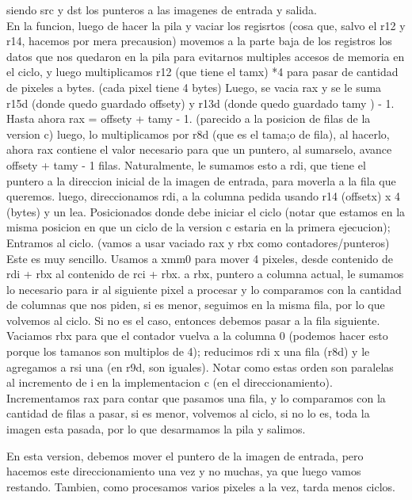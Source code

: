 \documentclass[a4paper]{article}
\begin{document}
     siendo src y dst los punteros a las imagenes de entrada y salida.
    \hfill \break
    \\
     En la funcion, luego de hacer la pila y vaciar los regisrtos (cosa que, salvo el r12 y r14, hacemos por mera precausion) movemos a la parte baja de los registros los datos que nos quedaron en la pila para evitarnos multiples accesos de memoria en el ciclo, y luego multiplicamos r12 (que tiene el tamx) *4 para pasar de cantidad de pixeles a bytes. (cada pixel tiene 4 bytes)
     \hfill \break
     Luego, se vacia rax y se le suma r15d (donde quedo guardado offsety) y r13d (donde quedo guardado tamy ) - 1.
     Hasta ahora rax = offsety + tamy - 1. (parecido a la posicion de filas de la version c) luego, lo multiplicamos por r8d (que es el tama;o de fila), al hacerlo, ahora rax contiene el valor necesario para que un puntero, al sumarselo, avance offsety + tamy - 1 filas. Naturalmente, le sumamos esto a rdi, que tiene el puntero a la direccion inicial de la imagen de entrada, para moverla a la fila que queremos. luego, direccionamos rdi, a la columna pedida usando r14 (offsetx) x 4 (bytes) y un lea. Posicionados donde debe iniciar el ciclo (notar que estamos en la misma posicion en que un ciclo de la version c estaria  en la primera ejecucion);
     \hfill \break
      Entramos al ciclo. (vamos a usar vaciado rax y rbx como contadores/punteros)
       Este es muy sencillo. Usamos a xmm0 para mover 4 pixeles, desde contenido de rdi + rbx al contenido de rci + rbx.
      a rbx,  puntero a columna actual, le sumamos lo necesario para ir al siguiente pixel a procesar y lo comparamos con la cantidad de columnas que nos piden, si es menor, seguimos en la misma fila, por lo que volvemos al ciclo.       
      Si no es el caso, entonces debemos pasar a la fila siguiente. Vaciamos rbx para que el contador vuelva a la columna 0 (podemos hacer esto porque los tamanos son multiplos de 4); reducimos rdi x una fila (r8d) y le agregamos a rsi una (en r9d, son iguales). Notar como estas orden son paralelas al incremento de i  en la implementacion c (en el direccionamiento).
      \hfill \break      
      Incrementamos rax para contar que pasamos una fila, y lo comparamos con la cantidad de filas a pasar, si es menor, volvemos al ciclo, si no lo es, toda la imagen esta pasada, por lo que desarmamos la pila y salimos.
      
      En esta version, debemos mover el puntero de la imagen de entrada, pero hacemos este direccionamiento una vez y no muchas, ya que luego vamos restando. Tambien, como procesamos varios pixeles a la vez, tarda menos ciclos.
	     
\end{document}

